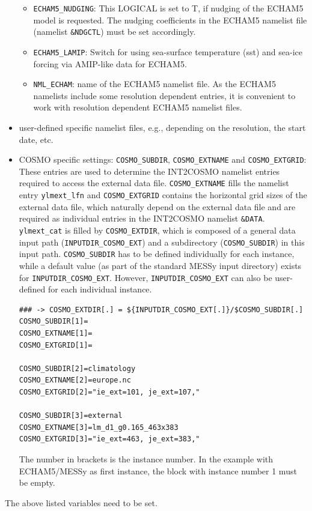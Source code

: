 \documentclass[11pt,twoside]{article}
\begin{document}
\begin{itemize}
\begin{itemize}
\item \verb|ECHAM5_NUDGING|: This {\footnotesize LOGICAL } is set to T, 
if nudging of the ECHAM5 model 
is requested. The nudging coefficients in the ECHAM5 namelist file (namelist
\verb|&NDGCTL|) must be set accordingly. 
\item \verb|ECHAM5_LAMIP|: Switch for using sea-surface temperature (sst) and  
sea-ice forcing via AMIP-like data for ECHAM5.
\item \verb|NML_ECHAM|: name of the ECHAM5 namelist file. As the ECHAM5
namelists include some resolution dependent entries, it is convenient to work
 with resolution dependent ECHAM5 namelist files.
\end{itemize}
\item user-defined specific namelist files, e.g., depending on the
 resolution, the start date, etc.
\item COSMO specific settings: \verb|COSMO_SUBDIR|, \verb|COSMO_EXTNAME| and \verb|COSMO_EXTGRID|:
These entries are used to determine the INT2COSMO namelist entries required to
 access the external data file.  
\verb|COSMO_EXTNAME| fills the namelist entry \verb|ylmext_lfn|
 and \verb|COSMO_EXTGRID| contains the horizontal grid sizes of the
external data file, which naturally depend on the external data file and are
required as individual entries in the INT2COSMO namelist \verb|&DATA|.
 \verb|ylmext_cat| is filled by \verb|COSMO_EXTDIR|, which is composed of a 
 general data input path (\verb|INPUTDIR_COSMO_EXT|) and a subdirectory 
(\verb|COSMO_SUBDIR|) in this input path. 
\verb|COSMO_SUBDIR| has to be defined individually for each instance, while
 a default value (as part of the standard MESSy input directory) 
exists for \verb|INPUTDIR_COSMO_EXT|. However, \verb|INPUTDIR_COSMO_EXT| 
can also be user-defined for each individual instance.
\begin{verbatim}
### -> COSMO_EXTDIR[.] = ${INPUTDIR_COSMO_EXT[.]}/$COSMO_SUBDIR[.]
COSMO_SUBDIR[1]=
COSMO_EXTNAME[1]=
COSMO_EXTGRID[1]=

COSMO_SUBDIR[2]=climatology
COSMO_EXTNAME[2]=europe.nc
COSMO_EXTGRID[2]="ie_ext=101, je_ext=107,"

COSMO_SUBDIR[3]=external
COSMO_EXTNAME[3]=lm_d1_g0.165_463x383
COSMO_EXTGRID[3]="ie_ext=463, je_ext=383,"
\end{verbatim}
The number in brackets is the instance number. In the example with ECHAM5/MESSy
 as first instance, the block with instance number 1 must be empty.
\end{itemize}
The above listed variables need to be set.
\end{document}
